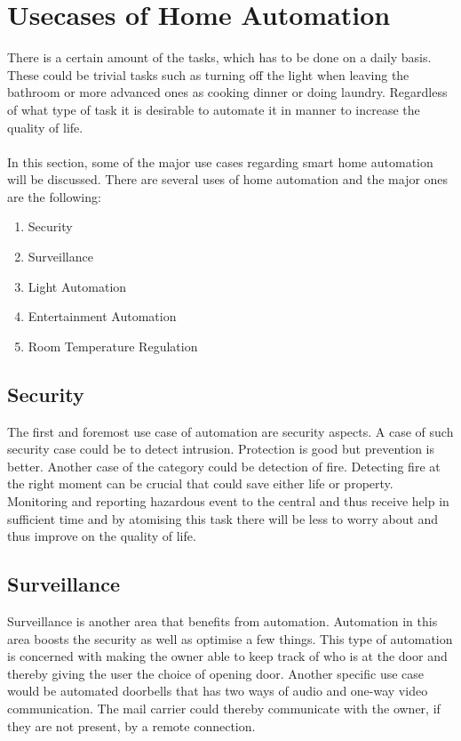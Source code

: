 \section{Usecases of Home Automation}
\label{sec:Usecases of Home Automation}
There is a certain amount of the tasks, which has to be done on a daily basis. These could be trivial tasks such as turning off the light when leaving the bathroom or more advanced ones as cooking dinner or doing laundry. Regardless of what type of task it is desirable to automate it in manner to increase the quality of life.
\\\\
In this section, some of the major use cases regarding smart home automation will be discussed. There are several uses of home automation and the major ones are the following:

\begin{enumerate}
  \item Security
  \item Surveillance
  \item Light Automation
  \item Entertainment Automation
  \item Room Temperature Regulation
\end{enumerate}

\subsection{Security}
\label{sub:Security}
The first and foremost use case of automation are security aspects. A case of such security case could be to detect intrusion. Protection is good but prevention is better. Another case of the category could be detection of fire. Detecting fire at the right moment can be crucial that could save either life or property. Monitoring and reporting hazardous event to the central and thus receive help in sufficient time and by atomising this task there will be less to worry about and thus improve on the quality of life.

\subsection{Surveillance}
\label{sub:Surveillance}
Surveillance is another area that benefits from automation. Automation in this area boosts the security as well as optimise a few things. This type of automation is concerned with making the owner able to keep track of who is at the door and thereby giving the user the choice of opening door. Another specific use case would be automated doorbells that has two ways of audio and one-way video communication. The mail carrier could thereby communicate with the owner, if they are not present, by a remote connection. 

